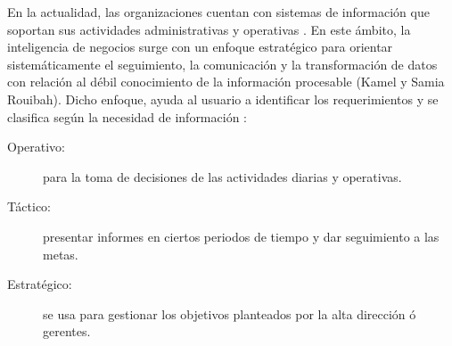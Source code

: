 \documentclass[11pt,titlepage]{report}
\begin{document}
En la actualidad, las organizaciones cuentan con sistemas de información que soportan sus actividades administrativas y operativas \cite{tes02}. En este ámbito, la inteligencia de negocios surge con un enfoque estratégico para orientar sistemáticamente el seguimiento, la comunicación y la transformación de datos con relación al débil conocimiento de la información procesable (Kamel y Samia Rouibah). Dicho enfoque, ayuda al usuario a identificar los requerimientos y se clasifica según la necesidad de información \cite{web04}:
\begin{description}
\item[Operativo:] para la toma de decisiones de las actividades diarias y operativas.

\item[Táctico:] presentar informes en ciertos periodos de tiempo y dar seguimiento a las metas.

\item[Estratégico:] se usa para gestionar los objetivos planteados por la alta dirección ó gerentes.\\

\end{description}
\end{document}

